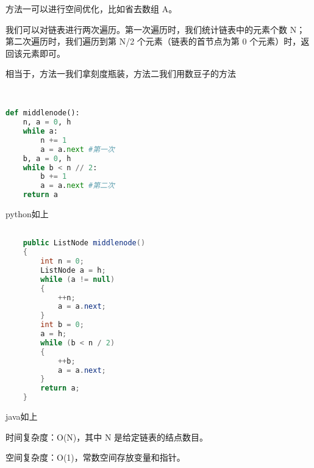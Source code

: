 方法一可以进行空间优化，比如省去数组 A。

我们可以对链表进行两次遍历。第一次遍历时，我们统计链表中的元素个数 N；第二次遍历时，我们遍历到第 N/2 个元素（链表的首节点为第 0 个元素）时，返回该元素即可。

相当于，方法一我们拿刻度瓶装，方法二我们用数豆子的方法
\begin{lstlisting}[language=python]


def middlenode():
    n, a = 0, h
    while a:
        n += 1
        a = a.next #第一次
    b, a = 0, h
    while b < n // 2:
        b += 1
        a = a.next #第二次
    return a

\end{lstlisting}
python如上
\begin{lstlisting}[language=java]

    public ListNode middlenode() 
    {
        int n = 0;
        ListNode a = h;
        while (a != null) 
        {
            ++n;
            a = a.next;
        }
        int b = 0;
        a = h;
        while (b < n / 2) 
        {
            ++b;
            a = a.next;
        }
        return a;
    }

\end{lstlisting}
java如上

时间复杂度：O(N)，其中 N 是给定链表的结点数目。

空间复杂度：O(1)，常数空间存放变量和指针。
